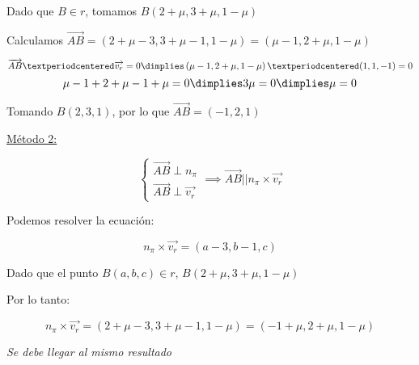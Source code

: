 \documentclass[palatino,nosec,nochap,nobuilddate]{Docencia}
\renewcommand{\vec}[1]{\overrightarrow{#1}}
\begin{document}
\begin{problem}[5]
Dado que $B\in r$, tomamos $B\left(2+\mu,3+\mu,1-\mu\right)$

Calculamos $\vec{AB} = \left(2+\mu-3,3+\mu-1,1-\mu\right) = \left(\mu-1,2+\mu,1-\mu\right)$

\[\vec{AB}·\vec{v_r} = 0 \dimplies  \left(\mu-1,2+\mu,1-\mu\right)·(1,1,-1)=0\]
\[ \mu-1+2+\mu-1+\mu = 0 \dimplies 3\mu = 0 \dimplies \mu=0\]

Tomando $B(2,3,1)$, por lo que $\vec{AB} = (-1,2,1)$

\ul{Método 2:}

\[
\begin{cases}
\vec{AB}\perp n_{\pi}\\
\vec{AB}\perp \vec{v_r}
\end{cases}\implies \vec{AB} || n_{\pi}\times\vec{v_r}
\]

Podemos resolver la ecuación:

\[
n_{\pi}\times\vec{v_r} = (a-3,b-1,c)
\]

Dado que el punto $B(a,b,c)\in r$, $B(2+\mu,3+\mu,1-\mu)$

Por lo tanto:


\[
n_{\pi}\times\vec{v_r} = (2+\mu-3,3+\mu-1,1-\mu) = (-1+\mu,2+\mu,1-\mu)
\]

\textit{Se debe llegar al mismo resultado}

\end{problem}
\end{document}
